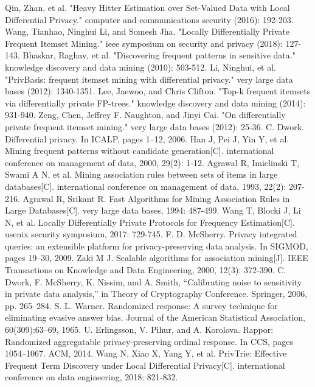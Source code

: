 \documentclass[conference]{IEEEtran}
\begin{document}
\begin{thebibliography}{00}
 Qin, Zhan, et al. "Heavy Hitter Estimation over Set-Valued Data with Local Differential Privacy." computer and communications security (2016): 192-203.
 Wang, Tianhao, Ninghui Li, and Somesh Jha. "Locally Differentially Private Frequent Itemset Mining." ieee symposium on security and privacy (2018): 127-143.
 Bhaskar, Raghav, et al. "Discovering frequent patterns in sensitive data." knowledge discovery and data mining (2010): 503-512.
 Li, Ninghui, et al. "PrivBasis: frequent itemset mining with differential privacy." very large data bases (2012): 1340-1351.
 Lee, Jaewoo, and Chris Clifton. "Top-k frequent itemsets via differentially private FP-trees." knowledge discovery and data mining (2014): 931-940.
 Zeng, Chen, Jeffrey F. Naughton, and Jinyi Cai. "On differentially private frequent itemset mining." very large data bases (2012): 25-36.
 C. Dwork. Differential privacy. In ICALP, pages 1–12, 2006.
 Han J, Pei J, Yin Y, et al. Mining frequent patterns without candidate generation[C]. international conference on management of data, 2000, 29(2): 1-12.
 Agrawal R, Imielinski T, Swami A N, et al. Mining association rules between sets of items in large databases[C]. international conference on management of data, 1993, 22(2): 207-216.
 Agrawal R, Srikant R. Fast Algorithms for Mining Association Rules in Large Databases[C]. very large data bases, 1994: 487-499.
 Wang T, Blocki J, Li N, et al. Locally Differentially Private Protocols for Frequency Estimation[C]. usenix security symposium, 2017: 729-745.
 F. D. McSherry. Privacy integrated queries: an extensible platform for privacy-preserving data
analysis. In SIGMOD, pages 19–30, 2009.
 Zaki M J. Scalable algorithms for association mining[J]. IEEE Transactions on Knowledge and Data Engineering, 2000, 12(3): 372-390.
 C. Dwork, F. McSherry, K. Nissim, and A. Smith, “Calibrating noise to sensitivity in private data analysis,” in Theory of Cryptography Conference. Springer, 2006, pp. 265–284.
 S. L. Warner. Randomized response: A survey technique for eliminating evasive answer bias. Journal of the American Statistical Association, 60(309):63–69, 1965.
 U. Erlingsson, V. Pihur, and A. Korolova. Rappor: Randomized aggregatable privacy-preserving ordinal response. In CCS, pages 1054–1067. ACM, 2014.
 Wang N, Xiao X, Yang Y, et al. PrivTrie: Effective Frequent Term Discovery under Local Differential Privacy[C]. international conference on data engineering, 2018: 821-832.



\end{thebibliography}
\end{document}
